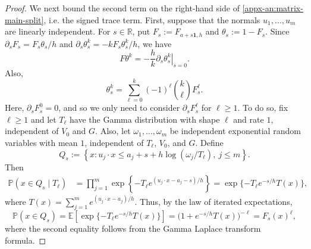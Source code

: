 \documentclass[11pt,letterpaper]{article}
\theoremstyle{remark}
\newcommand{\E}{\mathbb E}
\newcommand{\Pp}{\mathbb P}
\newcommand{\R}{\mathbb R}
\begin{document}
\begin{proof}
We next bound the second term on the right-hand side of \eqref{appx-an:matrix-main-split}, i.e. the signed trace term.
First, suppose that the normals $u_1,\dots, u_m$ are linearly independent. For
\(s\in\R\), put \(F_s:=F_{a+s\mathbf1,h}\) and
\(\theta_s:=1-F_s\).
Since
\( \partial_s F_s= F_s\theta_s/h\) and \(\partial_s\theta_s^k=-kF_s\theta_s^k/h\),
we have
\begin{equation}\label{eq: F theta k trick}
 F\theta^k=-\frac hk
 \left.\partial_s\theta_s^k\right|_{s=0}.
\end{equation}
Also,
\begin{equation}\label{eq: theta expansion}
 \theta_s^k
 =\sum_{\ell=0}^k(-1)^\ell\binom{k}{\ell}F_s^\ell.
\end{equation}
Here, $\partial_s F_s^0 = 0$, and so we only need to consider $\partial_s F_s^{\ell}$ for $\ell\geq 1$. To do so, fix $\ell\ge1$ and let $T_\ell$ have the Gamma
distribution with shape $\ell$ and rate \(1\), independent of $V_0$ and $G$. Also, let $\omega_1,\ldots,\omega_m$ be independent exponential random variables with mean \(1\), independent of $T_\ell$, $V_0$, and $G$.
Define
\[
 Q_s :=\left\{x:
 u_j\cdot x\le a_j+s+h\log(\omega_j/T_\ell),
 \ j\le m\right\}.
\]
Then
\[
 \begin{aligned}
 \Pp(x\in Q_s\mid T_\ell)
 &=\prod_{j=1}^m
 \exp\left\{-T_\ell
 e^{(u_j\cdot x-a_j-s)/h}\right\}
 =\exp\{-T_\ell e^{-s/h}T(x)\},
 \end{aligned}
\]
where $T(x) = \sum_{j=1}^m e^{(u_j\cdot x-a_j)/h}$. Thus, by the law of iterated expectations,
\begin{equation}
\Pp(x\in Q_s) = \E[\exp\{-T_\ell e^{-s/h}T(x)\}] = \bigl(1+e^{-s/h}T(x)\bigr)^{-\ell} = F_s(x)^\ell,
 \label{appx-an:gamma-mixture}
\end{equation}
where the second equality follows from the Gamma Laplace transform formula.


\end{proof}
\end{document}

